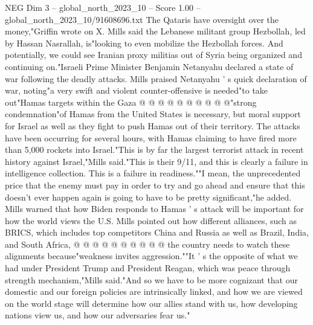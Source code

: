 \begin{textsample}{NEG Dim 3 – global\_north\_2023\_10 – Score 1.00 – global\_north\_2023\_10/91608696.txt}
The Qataris have oversight over the money,"Griffin wrote on X.
Mills said the Lebanese militant group Hezbollah, led by Hassan Nasrallah, is"looking to even mobilize the Hezbollah forces.
And potentially, we could see Iranian proxy militias out of Syria being organized and continuing on."Israeli Prime Minister Benjamin Netanyahu declared a state of war following the deadly attacks.
Mills praised Netanyahu ' s quick declaration of war, noting"a very swift and violent counter-offensive is needed"to take out"Hamas targets within the Gaza @ @ @ @ @ @ @ @ @ @"strong condemnation"of Hamas from the United States is necessary, but moral support for Israel as well as they fight to push Hamas out of their territory.
The attacks have been occurring for several hours, with Hamas claiming to have fired more than 5,000 rockets into Israel."This is by far the largest terrorist attack in recent history against Israel,"Mills said."This is their 9/11, and this is clearly a failure in intelligence collection.
This is a failure in readiness.""I mean, the unprecedented price that the enemy must pay in order to try and go ahead and ensure that this doesn't ever happen again is going to have to be pretty significant,"he added.
Mills warned that how Biden responds to Hamas ' s attack will be important for how the world views the U.S.
Mills pointed out how different alliances, such as BRICS, which includes top competitors China and Russia as well as Brazil, India, and South Africa, @ @ @ @ @ @ @ @ @ @ the country needs to watch these alignments because"weakness invites aggression.""It ' s the opposite of what we had under President Trump and President Reagan, which was peace through strength mechanism,"Mills said."And so we have to be more cognizant that our domestic and our foreign policies are intrinsically linked, and how we are viewed on the world stage will determine how our allies stand with us, how developing nations view us, and how our adversaries fear us."

\end{textsample}
